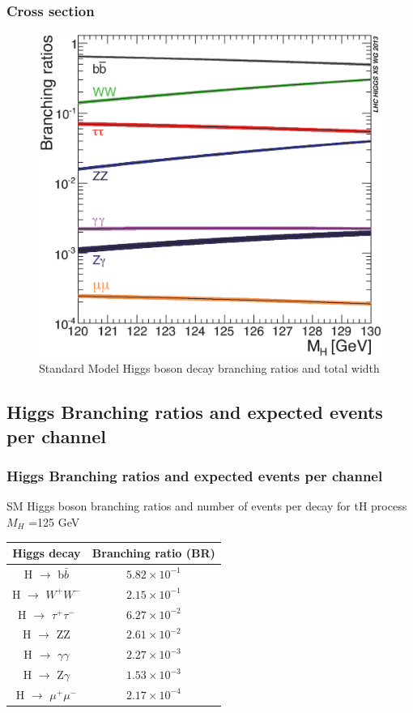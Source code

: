 \documentclass[11pt]{beamer}
\begin{document}
\begin{frame}
\frametitle{Cross section}
\begin{center}
	\begin{figure}
		\includegraphics[scale=0.42]{figures/Higgs_BR_120-130_7.eps}
		\caption{Standard Model Higgs boson decay branching ratios and total width}	
	\end{figure}
\end{center}
\end{frame}


\begin{frame}
\section{Higgs Branching ratios and expected events per channel}
\frametitle{Higgs Branching ratios and expected events per channel}
SM Higgs boson branching ratios and number of events per decay for tH process $M_H$ =125 GeV\\
\begin{center}
\begin{tabular}{|c|c|}
	\hline
	Higgs decay & Branching ratio (BR)\\
	\hline
	H $\rightarrow$ b$\bar{b}$ &
	$5.82\times 10^{-1}$ \\
	\hline
	H $\rightarrow$ $W^+W^-$ &
	$2.15\times10^{-1}$ \\
	\hline
	H $\rightarrow$ $\tau^+\tau^-$ &
	$6.27\times10^{-2}$\\
\hline
	H $\rightarrow$ ZZ &
$2.61\times10^{-2}$\\
\hline
	H $\rightarrow$ $\gamma\gamma$ &
$2.27\times10^{-3}$\\
\hline
	H $\rightarrow$ Z$\gamma$ &
$1.53\times10^{-3}$\\
\hline
	H $\rightarrow$ $\mu^+\mu^-$ &
$2.17\times10^{-4}$\\
\hline
\end{tabular}
\end{center}
\end{frame}
\end{document}
